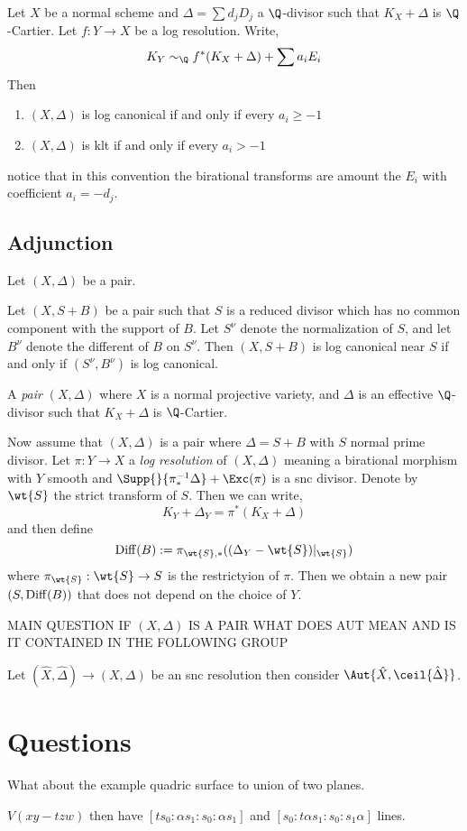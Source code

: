 \documentclass[12pt]{article}
\begin{document}
\begin{lemma}
Let $X$ be a normal scheme and $\Delta = \sum d_j D_j$ a $\Q$-divisor such that $K_X + \Delta$ is $\Q$-Cartier. Let $f : Y \to X$ be a log resolution. Write,
\[ K_Y \sim_{\Q} f^* (K_X + \Delta) + \sum a_i E_i \]
Then
\begin{enumerate}
\item $(X, \Delta)$ is log canonical if and only if every $a_i \ge -1$
\item $(X, \Delta)$ is klt if and only if every $a_i > -1$
\end{enumerate}
notice that in this convention the birational transforms are amount the $E_i$ with coefficient $a_i = -d_j$.
\end{lemma}

\subsection{Adjunction}

Let $(X, \Delta)$ be a pair. 

\begin{theorem}[Kawmata]
Let $(X, S + B)$ be a pair such that $S$ is a reduced divisor which has no common component with the support of $B$. Let $S^\nu$ denote the normalization of $S$, and let $B^\nu$ denote the different of $B$ on $S^\nu$. Then $(X, S + B)$ is log canonical near $S$ if and only if $(S^\nu, B^\nu)$ is log canonical.
\end{theorem}

\begin{defn}
A \textit{pair} $(X, \Delta)$ where $X$ is a normal projective variety, and $\Delta$ is an effective $\Q$-divisor such that $K_X + \Delta$ is $\Q$-Cartier. 
\end{defn}

Now assume that $(X, \Delta)$ is a pair where $\Delta = S + B$ with $S$ normal prime divisor. Let $\pi : Y \to X$ a \textit{log resolution} of $(X, \Delta)$ meaning a birational morphism with $Y$ smooth and $\Supp{}{\pi_*^{-1} \Delta} + \Exc(\pi)$ is a snc divisor. Denote by $\wt{S}$ the strict transform of $S$. Then we can write,
\[ K_Y + \Delta_Y = \pi^* ( K_X + \Delta) \]
and then define
\[ \Diff(B) := \pi_{\wt{S}, *} ((\Delta_Y - \wt{S})|_{\wt{S}}) \]
where $\pi_{\wt{S}} : \wt{S} \to S$ is the restrictyion of $\pi$. Then we obtain a new pair $(S, \mathrm{Diff}(B))$ that does not depend on the choice of $Y$.




MAIN QUESTION IF $(X, \Delta)$ IS A PAIR WHAT DOES AUT MEAN AND IS IT CONTAINED IN THE FOLLOWING GROUP

Let $(\hat{X}, \hat{\Delta}) \to (X, \Delta)$ be an snc resolution then consider $\Aut{\hat{X}, \ceil{\hat{\Delta}}}$. 

\section{Questions}

What about the example quadric surface to union of two planes. 

$V(xy - t zw)$ then have $[t s_0 : \alpha s_1 : s_0  : \alpha s_1 ]$ and $[s_0 : t \alpha s_1 : s_0 : s_1 \alpha]$ lines.
\end{document}
